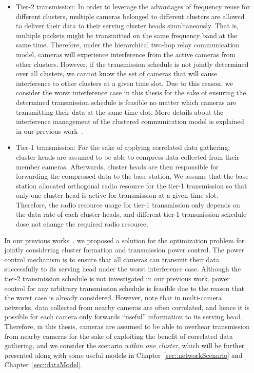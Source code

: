\begin{itemize}
\item Tier-2 transmission: In order to leverage the advantages of frequency reuse for different clusters, multiple cameras belonged to different clusters are allowed to deliver their data to their serving cluster heads simultaneously.
That is, multiple packets might be transmitted on the same frequency band at the same time.
Therefore, under the hierarchical two-hop relay communication model, cameras will experience interference from the active cameras from other clusters.
However, if the transmission schedule is not jointly determined over all clusters, we cannot know the set of cameras that will cause interference to other clusters at a given time slot.
Due to this reason, we consider the worst interference case in this thesis for the sake of ensuring the determined transmission schedule is feasible no matter which cameras are transmitting their data at the same time slot.
More details about the interference management of the clustered communication model is explained in our previous work~\cite{steven}.
\item Tier-1 transmission: For the sake of applying correlated data gathering, cluster heads are assumed to be able to compress data collected from their member cameras.
Afterwards, cluster heads are then responsible for forwarding the compressed data to the base station.
We assume that the base station allocated orthogonal radio resource for the tier-1 transmission so that only one cluster head is active for transmission at a given time slot.
Therefore, the radio resource usage for tier-1 transmission only depends on the data rate of each cluster heads, and different tier-1 transmission schedule dose not change the required radio resource. 
\end{itemize}

In our previous works~\cite{VTCCluster}, we proposed a solution for the optimization problem for jointly considering cluster formation and transmission power control.
The power control mechanism is to ensure that all cameras can transmit their data successfully to its serving head under the worst interference case.
Although the tier-2 transmission schedule is not investigated in our previous work, power control for any arbitrary transmission schedule is feasible due to the reason that the worst case is already considered.
However, note that in multi-camera networks, data collected from nearby cameras are often correlated, and hence it is possible for each camera only forwards ``useful'' information to its serving head.
Therefore, in this thesis, cameras are assumed to be able to overhear transmission from nearby cameras for the sake of exploiting the benefit of correlated data gathering, and we consider the scenario \emph{within one cluster}, which will be further presented along with some useful models in Chapter~\ref{sec::networkScenario} and Chapter~\ref{sec::dataModel}.
